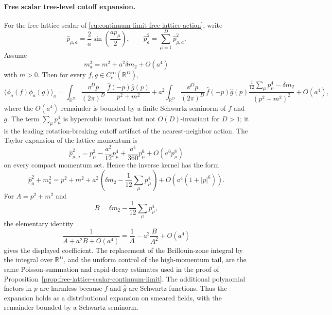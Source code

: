 \paragraph{Free scalar tree-level cutoff expansion.}
For the free lattice scalar of
\eqref{eq:continuum-limit-free-lattice-action}, write
\[
  \hat p_{\mu,a}=\frac{2}{a}\sin\!\left(\frac{ap_\mu}{2}\right),
  \qquad
  \hat p_a^2=\sum_{\mu=1}^D\hat p_{\mu,a}^2 .
\]
Assume
\begin{equation}
  m_a^2=m^2+a^2\delta m_2+O(a^4)
  \label{eq:symanzik-free-mass-trajectory}
\end{equation}
with \(m>0\).  Then for every \(f,g\in C_c^\infty(\mathbb R^D)\),
\begin{equation}
  \langle\phi_a(f)\phi_a(g)\rangle_a
  =
  \int_{\mathbb R^D}\frac{\dd^Dp}{(2\pi)^D}\,
  \frac{\widehat f(-p)\widehat g(p)}{p^2+m^2}
  +
  a^2
  \int_{\mathbb R^D}\frac{\dd^Dp}{(2\pi)^D}\,
  \widehat f(-p)\widehat g(p)
  \frac{\frac1{12}\sum_{\mu}p_\mu^4-\delta m_2}
       {(p^2+m^2)^2}
  +O(a^4),
  \label{eq:free-scalar-tree-level-symanzik-propagator}
\end{equation}
where the \(O(a^4)\) remainder is bounded by a finite Schwartz seminorm of
\(f\) and \(g\).  The term \(\sum_\mu p_\mu^4\) is hypercubic invariant but
not \(O(D)\)-invariant for \(D>1\); it is the leading rotation-breaking
cutoff artifact of the nearest-neighbor action.
The Taylor expansion of the lattice momentum is
\begin{equation}
  \hat p_{\mu,a}^2
  =
  p_\mu^2-\frac{a^2}{12}p_\mu^4
  +\frac{a^4}{360}p_\mu^6+O(a^6p_\mu^8)
  \label{eq:lattice-momentum-symanzik-expansion}
\end{equation}
on every compact momentum set.  Hence the inverse kernel has the form
\[
  \hat p_a^2+m_a^2
  =
  p^2+m^2
  +
  a^2\left(
    \delta m_2-\frac1{12}\sum_\mu p_\mu^4
  \right)
  +
  O(a^4(1+|p|^6)).
\]
For \(A=p^2+m^2\) and
\[
  B=\delta m_2-\frac1{12}\sum_\mu p_\mu^4,
\]
the elementary identity
\[
  \frac1{A+a^2B+O(a^4)}
  =
  \frac1A-a^2\frac{B}{A^2}+O(a^4)
\]
gives the displayed coefficient.  The replacement of the Brillouin-zone
integral by the integral over \(\mathbb R^D\), and the uniform control of
the high-momentum tail, are the same Poisson-summation and rapid-decay
estimates used in the proof of
Proposition~\ref{prop:free-lattice-scalar-continuum-limit}.  The additional
polynomial factors in \(p\) are harmless because \(\widehat f\) and
\(\widehat g\) are Schwartz functions.  Thus the expansion holds as a
distributional expansion on smeared fields, with the remainder bounded by a
Schwartz seminorm.


